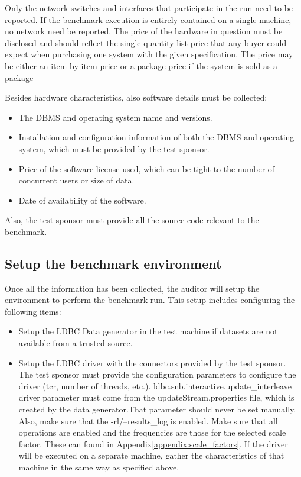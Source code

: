Only the network switches and interfaces that participate in the run need to be
reported. If the benchmark execution is entirely contained on a single machine,
no network need be reported.  The price of the hardware in question must be
disclosed and should reflect the single quantity list price that any buyer
could expect when purchasing one system with the given specification. The price
may be either an item by item price or a package price if the system is sold as
a package

Besides hardware characteristics, also software details must be collected:

\begin{itemize}
\item The DBMS and operating system name and versions.
\item Installation and configuration information of both the DBMS and operating
system, which must be provided by the test sponsor.
\item Price of the software license used, which can be tight to the number of
concurrent users or size of data.
\item Date of availability of the software.
\end{itemize}

Also, the test sponsor must provide all the source code relevant to the
benchmark.

\subsection{Setup the benchmark environment}

Once all the information has been collected, the auditor will setup the
environment to perform the benchmark run. This setup includes configuring the
following items:


\begin{itemize}
\item Setup the LDBC Data generator in the test machine if datasets are not
available from a trusted source.
\item Setup the LDBC driver with the connectors provided by the test sponsor.
The test sponsor must provide the configuration parameters to configure the
driver (tcr, number of threads, etc.).  ldbc.snb.interactive.update\_interleave
driver parameter must come from the updateStream.properties file, which is
created by the data generator.That parameter should never be set manually.
Also, make sure that the -rl/--results\_log is enabled.  Make sure that all
operations are enabled and the frequencies are those for the selected scale
factor. These can found in Appendix\ref{appendix:scale_factors}.  If the driver
will be executed on a separate machine, gather the characteristics of that
machine in the same way as specified above.
\end{itemize}


